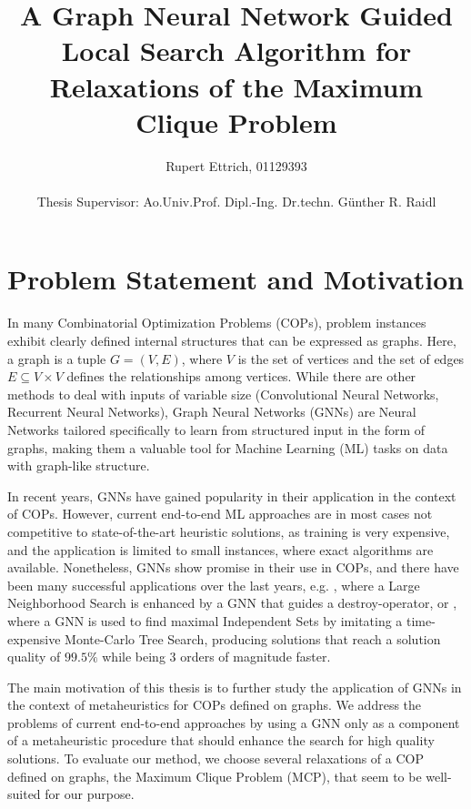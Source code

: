 \documentclass [11pt]{article}
\title{A Graph Neural Network Guided Local Search Algorithm for Relaxations of the Maximum Clique Problem}
\author{Rupert Ettrich, 01129393 \\\\ Thesis Supervisor: Ao.Univ.Prof. Dipl.-Ing. Dr.techn. Günther R. Raidl}
\date{}
\begin{document}
	
\maketitle 
 
\section{Problem Statement and Motivation}

In many Combinatorial Optimization Problems (COPs), problem instances exhibit clearly defined internal structures that can be expressed as graphs. Here, a graph is a tuple $G = (V, E)$, where $V$ is the set of vertices and the set of edges $E \subseteq V \times V$ defines the relationships among vertices. While there are other methods to deal with inputs of variable size (Convolutional Neural Networks, Recurrent Neural Networks), Graph Neural Networks (GNNs) are Neural Networks tailored specifically to learn from structured input in the form of graphs, making them a valuable tool for Machine Learning (ML) tasks on data with graph-like structure.   

In recent years, GNNs have gained popularity in their application in the context of COPs. However, current end-to-end ML approaches are in most cases not competitive to state-of-the-art heuristic solutions, as training is very expensive, and the application is limited to small instances, where exact algorithms are available. Nonetheless, GNNs show promise in their use in COPs, and there have been many successful applications over the last years, e.g. 
\cite{Oberweger2022}, where a Large Neighborhood Search is enhanced by a GNN that guides a destroy-operator, or \cite{NEURIPS2021_0db2e204}, where a GNN is used to find maximal Independent Sets by imitating a time-expensive Monte-Carlo Tree Search, producing solutions that reach a solution quality of $99.5\%$ while being 3 orders of magnitude faster. 

The main motivation of this thesis is to further study the application of GNNs in the context of metaheuristics for COPs defined on graphs. We address the problems of current end-to-end approaches by using a GNN only as a component of a metaheuristic procedure that should enhance the search for high quality solutions. To evaluate our method, we choose several relaxations of a COP defined on graphs, the Maximum Clique Problem (MCP), that seem to be well-suited for our purpose. 
\end{document}
